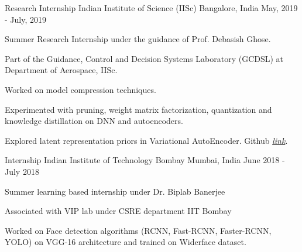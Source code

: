 

\begin{cventries}

  \cventry
    {Research Internship} %
    {Indian Institute of Science (IISc)} %
    {Bangalore, India} %
    {May, 2019 - July, 2019} %
    {
      \begin{cvitems} %
        \item {Summer Research Internship under the guidance of Prof. Debasish Ghose.}
        \item {Part of the  Guidance, Control and Decision Systems Laboratory (GCDSL) at Department of Aerospace, IISc.}
        \item {Worked on model compression techniques.}
        \item {Experimented with pruning, weight matrix factorization, quantization and knowledge distillation on DNN and autoencoders.}
        \item {Explored latent representation priors in Variational AutoEncoder. Github 
        \emph{\href{https://github.com/GopiKishan14/Model_Compression}{link}}.
        }
      \end{cvitems}
    }

  \cventry
    {Internship} %
    {Indian Institute of Technology Bombay} %
    {Mumbai, India} %
    {June 2018 - July 2018} %
    {
      \begin{cvitems} %
        \item {Summer learning based internship under Dr. Biplab Banerjee}
        \item {Associated with VIP lab under CSRE department IIT Bombay}
        \item {Worked on Face detection algorithms (RCNN, Fast-RCNN, Faster-RCNN, YOLO) on VGG-16 architecture and trained on Widerface dataset.}
      \end{cvitems}
    }

  
\end{cventries}
